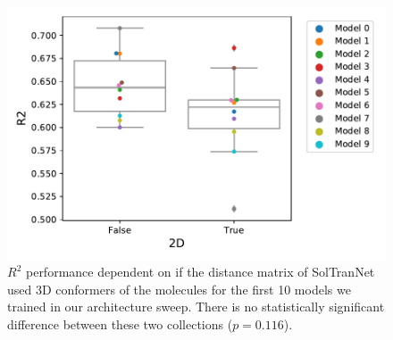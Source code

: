 \documentclass[journal=jcisd8,manuscript=article]{achemso}
\begin{document}
\begin{figure}[tb]
    \centering
    \includegraphics[width=\linewidth]{figures/2dv3d_r2.pdf}
    \caption{$R^2$ performance dependent on if the distance matrix of SolTranNet used 3D conformers of the molecules for the first 10 models we trained in our architecture sweep. There is no statistically significant difference between these two collections ($p=0.116$).}
    \label{fig:2dv3dr2}
\end{figure}
\end{document}
